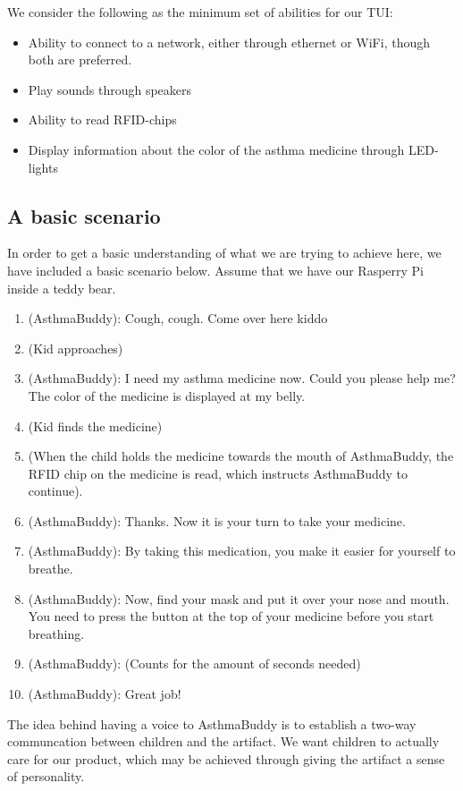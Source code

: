 We consider the following as the minimum set of abilities for our TUI:

\begin{itemize}
  \item Ability to connect to a network, either through ethernet or WiFi, though both are preferred. 
  \item Play sounds through speakers
  \item Ability to read RFID-chips
  \item Display information about the color of the asthma medicine through LED-lights
\end{itemize} 

\subsection{A basic scenario}
In order to get a basic understanding of what we are trying to achieve here, we have included a basic scenario below. Assume that we have our Rasperry Pi inside a teddy bear.  

\begin{enumerate}
  \item (AsthmaBuddy): Cough, cough. Come over here kiddo 
  \item (Kid approaches)
  \item (AsthmaBuddy): I need my asthma medicine now. Could you please help me? The color of the medicine is displayed at my belly.
  \item (Kid finds the medicine)
  \item (When the child holds the medicine towards the mouth of AsthmaBuddy, the RFID chip on the medicine is read, which instructs AsthmaBuddy to continue). 
  \item (AsthmaBuddy): Thanks. Now it is your turn to take your medicine. 
  \item (AsthmaBuddy): By taking this medication, you make it easier for yourself to breathe. 
  \item (AsthmaBuddy): Now, find your mask and put it over your nose and mouth. You need to press the button at the top of your medicine before you start breathing. 
  \item (AsthmaBuddy): (Counts for the amount of seconds needed)
  \item (AsthmaBuddy): Great job!
\end{enumerate}

The idea behind having a voice to AsthmaBuddy is to establish a two-way communcation between children and the artifact. We want children to actually care for our product, which may be achieved through giving the artifact a sense of personality. 


